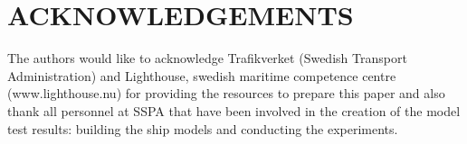 \section*{ACKNOWLEDGEMENTS}\label{acknowledgements}

The authors would like to acknowledge Trafikverket (Swedish Transport
Administration) and Lighthouse, swedish maritime competence centre
(www.lighthouse.nu) for providing the resources to prepare this paper
and also thank all personnel at SSPA that have been involved in the
creation of the model test results: building the ship models and
conducting the experiments.

    